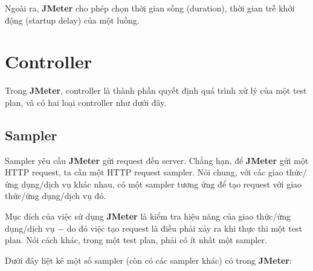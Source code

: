 \documentclass[10pt]{report}
\newcommand{\jmeter}{\textbf{JMeter}}
\begin{document}
\par Ngoài ra, \jmeter{} cho phép chọn thời gian sống (duration), thời gian trễ khởi động (startup delay) của một luồng.

\section{Controller}

\par Trong \jmeter{}, controller là thành phần quyết định quá trình xử lý của một test plan, và có hai loại controller như dưới đây.

\subsection{Sampler}

\par Sampler yêu cầu \jmeter{} gửi request đến server. Chẳng hạn, để \jmeter{} gửi một HTTP request, ta cần một HTTP request sampler. Nói chung, với các giao thức/ứng dụng/dịch vụ khác nhau, có một sampler tương ứng để tạo request với giao thức/ứng dụng/dịch vụ đó.

\par Mục đích của việc sử dụng \jmeter{} là kiểm tra hiệu năng của giao thức/ứng dụng/dịch vụ $-$ do đó việc tạo request là điều phải xảy ra khi thực thi một test plan. Nói cách khác, trong một test plan, phải có ít nhất một sampler.

\par Dưới đây liệt kê một số sampler (còn có các sampler khác) có trong \jmeter{}:
\end{document}
